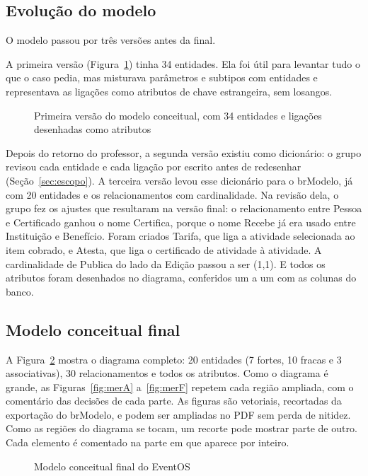 \subsection{Evolução do modelo}

O modelo passou por três versões antes da final.

A primeira versão (Figura~\ref{fig:merv1}) tinha 34 entidades. Ela foi útil para levantar tudo o que o caso pedia, mas misturava parâmetros e subtipos com entidades e representava as ligações como atributos de chave estrangeira, sem losangos.

\begin{figure}[h!]
\centering
\mervum
\caption{Primeira versão do modelo conceitual, com 34 entidades e ligações desenhadas como atributos}
\label{fig:merv1}
\end{figure}

Depois do retorno do professor, a segunda versão existiu como dicionário: o grupo revisou cada entidade e cada ligação por escrito antes de redesenhar (Seção~\ref{sec:escopo}). A terceira versão levou esse dicionário para o brModelo, já com 20 entidades e os relacionamentos com cardinalidade. Na revisão dela, o grupo fez os ajustes que resultaram na versão final: o relacionamento entre Pessoa e Certificado ganhou o nome Certifica, porque o nome Recebe já era usado entre Instituição e Benefício. Foram criados Tarifa, que liga a atividade selecionada ao item cobrado, e Atesta, que liga o certificado de atividade à atividade. A cardinalidade de Publica do lado da Edição passou a ser (1,1). E todos os atributos foram desenhados no diagrama, conferidos um a um com as colunas do banco.

\subsection{Modelo conceitual final}

A Figura~\ref{fig:merfinal} mostra o diagrama completo: 20 entidades (7 fortes, 10 fracas e 3 associativas), 30 relacionamentos e todos os atributos. Como o diagrama é grande, as Figuras~\ref{fig:merA} a~\ref{fig:merF} repetem cada região ampliada, com o comentário das decisões de cada parte. As figuras são vetoriais, recortadas da exportação do brModelo, e podem ser ampliadas no PDF sem perda de nitidez. Como as regiões do diagrama se tocam, um recorte pode mostrar parte de outro. Cada elemento é comentado na parte em que aparece por inteiro.

\begin{landscape}
\begin{figure}[p]
\centering
\mergeral
\caption{Modelo conceitual final do EventOS}
\label{fig:merfinal}
\end{figure}
\end{landscape}

